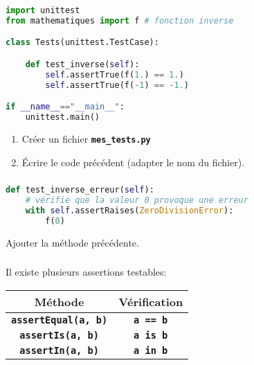 \documentclass[svgnames,11pt]{beamer}
\begin{document}
\begin{frame}[fragile]
    \frametitle{}
    \begin{lstlisting}[language=Python , basicstyle=\ttfamily\small, xleftmargin=1em, xrightmargin=0em]
import unittest
from mathematiques import f # fonction inverse

class Tests(unittest.TestCase):

    def test_inverse(self):
        self.assertTrue(f(1.) == 1.)
        self.assertTrue(f(-1) == -1.)

if __name__=="__main__":
    unittest.main()
\end{lstlisting}
    \begin{activite}
        \begin{enumerate}
            \item Créer un fichier \textbf{\texttt{mes\_tests.py}}
            \item Écrire le code précédent (adapter le nom du fichier).
        \end{enumerate}
    \end{activite}


\end{frame}
\begin{frame}[fragile]
    \frametitle{}

    \begin{activite}
        \begin{center}
            \begin{lstlisting}[language=Python , basicstyle=\ttfamily\small, xleftmargin=.5em, xrightmargin=0em]
def test_inverse_erreur(self):
    # vérifie que la valeur 0 provoque une erreur
    with self.assertRaises(ZeroDivisionError):
        f(0)
\end{lstlisting}
            \label{CODE}
        \end{center}
        Ajouter la méthode précédente.
    \end{activite}

\end{frame}
\begin{frame}
    \frametitle{}

    Il existe plusieurs assertions testables:
    \begin{center}
        \begin{tabular}{|*{2}{c|}}
            \hline
            Méthode                             & Vérification             \\
            \hline
            \textbf{\texttt{assertEqual(a, b)}} & \textbf{\texttt{a == b}} \\
            \hline
            \textbf{\texttt{assertIs(a, b)}}    & \textbf{\texttt{a is b}} \\
            \hline
            \textbf{\texttt{assertIn(a, b)}}    & \textbf{\texttt{a in b}} \\
            \hline
        \end{tabular}
    \end{center}

\end{frame}
\end{document}
